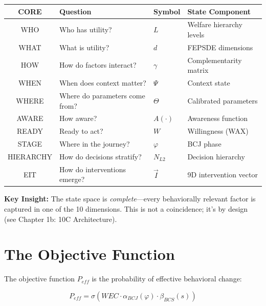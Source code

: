 \begin{tcolorbox}[colback=green!5!white,colframe=green!75!black,
    title=\textbf{10C State Space Mapping}]
\begin{center}
\begin{tabular}{|c|l|l|l|}
\hline
\textbf{CORE} & \textbf{Question} & \textbf{Symbol} & \textbf{State Component} \\
\hline
WHO & Who has utility? & $L$ & Welfare hierarchy levels \\
WHAT & What is utility? & $d$ & FEPSDE dimensions \\
HOW & How do factors interact? & $\gamma$ & Complementarity matrix \\
WHEN & When does context matter? & $\Psi$ & Context state \\
WHERE & Where do parameters come from? & $\Theta$ & Calibrated parameters \\
AWARE & How aware? & $A(\cdot)$ & Awareness function \\
READY & Ready to act? & $W$ & Willingness (WAX) \\
STAGE & Where in the journey? & $\varphi$ & BCJ phase \\
HIERARCHY & How do decisions stratify? & $N_{L2}$ & Decision hierarchy \\
EIT & How do interventions emerge? & $\vec{I}$ & 9D intervention vector \\
\hline
\end{tabular}
\end{center}
\end{tcolorbox}

\textbf{Key Insight:} The state space is \textit{complete}---every behaviorally relevant factor is captured in one of the 10 dimensions. This is not a coincidence; it's by design (see Chapter 1b: 10C Architecture).


\section{The Objective Function}
\label{sec:25-objective}

The objective function $P_{eff}$ is the probability of effective behavioral change:

\begin{equation}
P_{eff} = \sigma\left( WEC \cdot \alpha_{BCJ}(\varphi) \cdot \beta_{BCS}(s) \right)
\label{eq:peff}
\end{equation}

